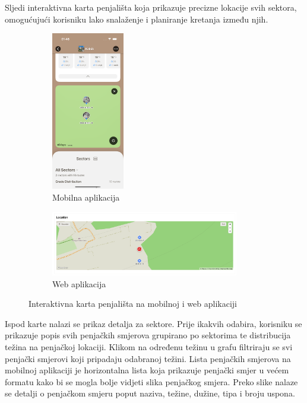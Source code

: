Sljedi interaktivna karta penjališta koja prikazuje precizne lokacije svih sektora, omogućujući korisniku lako snalaženje i planiranje kretanja između njih. 

\begin{figure}[H]
    \centering
    \begin{subfigure}[b]{\textwidth}
        \centering
        \includegraphics[width=0.35\textwidth]{images/implementacija/crag-details/crag-map.png}
        \caption{Mobilna aplikacija}
        \label{fig:interaktivna_karta_mob}
    \end{subfigure}
    \hfill
    \begin{subfigure}[b]{\textwidth}
        \centering
        \includegraphics[width=0.9\textwidth]{images/implementacija/web/crag-details/crag-map.png}
        \caption{Web aplikacija}
        \label{fig:interaktivna_karta_web}
    \end{subfigure}
    \caption{Interaktivna karta penjališta na mobilnoj i web aplikaciji}
    \label{fig:interaktivna_karta}
\end{figure}

Ispod karte nalazi se prikaz detalja za sektore. Prije ikakvih odabira, korisniku se prikazuje popis svih penjačkih smjerova grupirano po sektorima te distribucija težina na penjačkoj lokaciji. Klikom na određenu težinu u grafu filtriraju se svi penjački smjerovi koji pripadaju odabranoj težini. Lista penjačkih smjerova na mobilnoj aplikaciji je horizontalna lista koja prikazuje penjački smjer u većem formatu kako bi se mogla bolje vidjeti slika penjačkog smjera. Preko slike nalaze se detalji o penjačkom smjeru poput naziva, težine, dužine, tipa i broju uspona.

